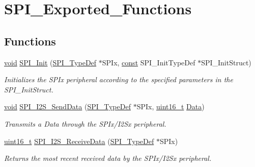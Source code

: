 \hypertarget{group___s_p_i___exported___functions}{\section{S\-P\-I\-\_\-\-Exported\-\_\-\-Functions}
\label{group___s_p_i___exported___functions}
}
\subsection*{Functions}
\begin{DoxyCompactItemize}
\item 
\hyperlink{group___n_a_m_e_ga18028b8badbf1ea7e704ccac3c488e82}{void} \hyperlink{group___s_p_i___exported___functions_ga3a2cbcf27cb1b160f6ef8fce23eff88c}{S\-P\-I\-\_\-\-Init} (\hyperlink{struct_s_p_i___type_def}{S\-P\-I\-\_\-\-Type\-Def} $\ast$S\-P\-Ix, \hyperlink{group___n_a_m_e_ga7ae6d0e43244213b34de2c2b9aa30da6}{const} S\-P\-I\-\_\-\-Init\-Type\-Def $\ast$S\-P\-I\-\_\-\-Init\-Struct)
\begin{DoxyCompactList}\small\item\em Initializes the S\-P\-Ix peripheral according to the specified parameters in the S\-P\-I\-\_\-\-Init\-Struct. \end{DoxyCompactList}\item 
\hyperlink{group___n_a_m_e_ga18028b8badbf1ea7e704ccac3c488e82}{void} \hyperlink{group___s_p_i___exported___functions_gad5af40bebe8dbe3fa8bd476489d7e3da}{S\-P\-I\-\_\-\-I2\-S\-\_\-\-Send\-Data} (\hyperlink{struct_s_p_i___type_def}{S\-P\-I\-\_\-\-Type\-Def} $\ast$S\-P\-Ix, \hyperlink{stdint_8h_a273cf69d639a59973b6019625df33e30}{uint16\-\_\-t} \hyperlink{group___copter_control_b_l_ga6f3335509cc4943e20df66f72483910c}{Data})
\begin{DoxyCompactList}\small\item\em Transmits a Data through the S\-P\-Ix/\-I2\-Sx peripheral. \end{DoxyCompactList}\item 
\hyperlink{stdint_8h_a273cf69d639a59973b6019625df33e30}{uint16\-\_\-t} \hyperlink{group___s_p_i___exported___functions_gab77de76547f3bff403236b263b070a30}{S\-P\-I\-\_\-\-I2\-S\-\_\-\-Receive\-Data} (\hyperlink{struct_s_p_i___type_def}{S\-P\-I\-\_\-\-Type\-Def} $\ast$S\-P\-Ix)
\begin{DoxyCompactList}\small\item\em Returns the most recent received data by the S\-P\-Ix/\-I2\-Sx peripheral. \end{DoxyCompactList}\item 

\end{DoxyCompactItemize}
